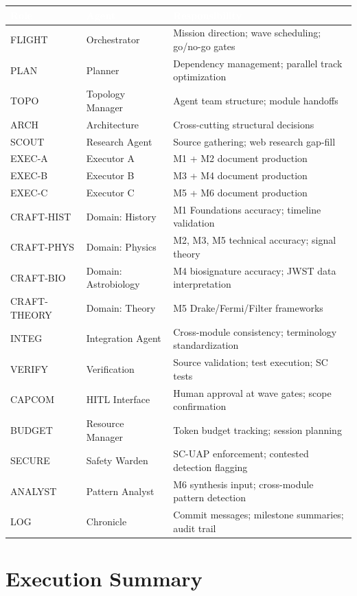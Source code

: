 \documentclass[11pt,letterpaper]{article}
\newcommand{\tableheader}[1]{\textbf{\sffamily\textcolor{white}{#1}}}
\begin{document}
\begin{center}
\begin{tabularx}{\textwidth}{L{2cm}L{3cm}X}
\toprule
{}
\tableheader{Role} & \tableheader{Agent} & \tableheader{Responsibility} \\
\midrule
FLIGHT & Orchestrator & Mission direction; wave scheduling; go/no-go gates \\
PLAN & Planner & Dependency management; parallel track optimization \\
TOPO & Topology Manager & Agent team structure; module handoffs \\
ARCH & Architecture & Cross-cutting structural decisions \\
SCOUT & Research Agent & Source gathering; web research gap-fill \\
EXEC-A & Executor A & M1 + M2 document production \\
EXEC-B & Executor B & M3 + M4 document production \\
EXEC-C & Executor C & M5 + M6 document production \\
CRAFT-HIST & Domain: History & M1 Foundations accuracy; timeline validation \\
CRAFT-PHYS & Domain: Physics & M2, M3, M5 technical accuracy; signal theory \\
CRAFT-BIO & Domain: Astrobiology & M4 biosignature accuracy; JWST data interpretation \\
CRAFT-THEORY & Domain: Theory & M5 Drake/Fermi/Filter frameworks \\
INTEG & Integration Agent & Cross-module consistency; terminology standardization \\
VERIFY & Verification & Source validation; test execution; SC tests \\
CAPCOM & HITL Interface & Human approval at wave gates; scope confirmation \\
BUDGET & Resource Manager & Token budget tracking; session planning \\
SECURE & Safety Warden & SC-UAP enforcement; contested detection flagging \\
ANALYST & Pattern Analyst & M6 synthesis input; cross-module pattern detection \\
LOG & Chronicle & Commit messages; milestone summaries; audit trail \\
\bottomrule
\end{tabularx}
\end{center}

\section{Execution Summary}
\end{document}
